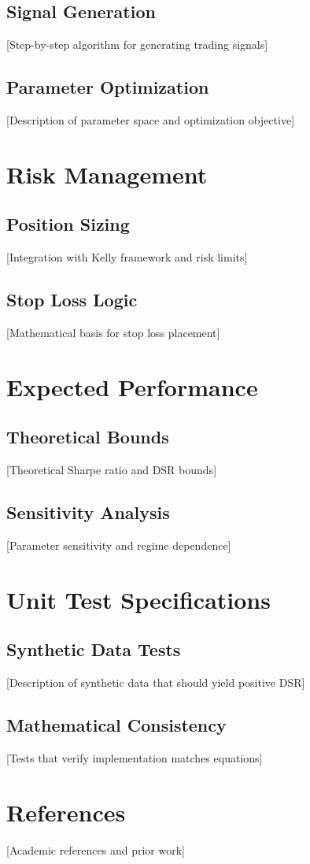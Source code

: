 \documentclass{article}
\begin{document}
\subsection{Signal Generation}

[Step-by-step algorithm for generating trading signals]

\subsection{Parameter Optimization}

[Description of parameter space and optimization objective]

\section{Risk Management}

\subsection{Position Sizing}

[Integration with Kelly framework and risk limits]

\subsection{Stop Loss Logic}

[Mathematical basis for stop loss placement]

\section{Expected Performance}

\subsection{Theoretical Bounds}

[Theoretical Sharpe ratio and DSR bounds]

\subsection{Sensitivity Analysis}

[Parameter sensitivity and regime dependence]

\section{Unit Test Specifications}

\subsection{Synthetic Data Tests}

[Description of synthetic data that should yield positive DSR]

\subsection{Mathematical Consistency}

[Tests that verify implementation matches equations]

\section{References}

[Academic references and prior work]
\end{document}
